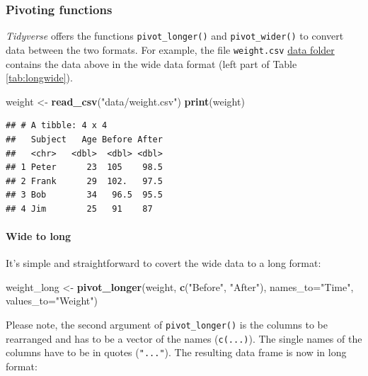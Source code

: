 \documentclass[
]{scrartcl}
\newenvironment{Shaded}{\begin{snugshade}}{\end{snugshade}}
\newcommand{\AttributeTok}[1]{\textcolor[rgb]{0.13,0.29,0.53}{#1}}
\newcommand{\FunctionTok}[1]{\textcolor[rgb]{0.13,0.29,0.53}{\textbf{#1}}}
\newcommand{\NormalTok}[1]{#1}
\newcommand{\OtherTok}[1]{\textcolor[rgb]{0.56,0.35,0.01}{#1}}
\newcommand{\StringTok}[1]{\textcolor[rgb]{0.31,0.60,0.02}{#1}}
\begin{document}
\hypertarget{pivoting-functions}{%
\subsubsection{Pivoting functions}\label{pivoting-functions}}

\emph{Tidyverse} offers the functions \texttt{pivot\_longer()} and \texttt{pivot\_wider()} to convert data between the two formats. For example, the file \texttt{weight.csv} \href{./data}{data folder} contains the data above in the wide data format (left part of Table \ref{tab:longwide}).

\begin{Shaded}
\begin{Highlighting}[]
\NormalTok{weight }\OtherTok{\textless{}{-}} \FunctionTok{read\_csv}\NormalTok{(}\StringTok{"data/weight.csv"}\NormalTok{)}
\FunctionTok{print}\NormalTok{(weight)}
\end{Highlighting}
\end{Shaded}

\begin{verbatim}
## # A tibble: 4 x 4
##   Subject   Age Before After
##   <chr>   <dbl>  <dbl> <dbl>
## 1 Peter      23  105    98.5
## 2 Frank      29  102.   97.5
## 3 Bob        34   96.5  95.5
## 4 Jim        25   91    87
\end{verbatim}

\hypertarget{wide-to-long}{%
\paragraph*{Wide to long}\label{wide-to-long}}

It's simple and straightforward to covert the wide data to a long format:

\begin{Shaded}
\begin{Highlighting}[]
\NormalTok{weight\_long }\OtherTok{\textless{}{-}} \FunctionTok{pivot\_longer}\NormalTok{(weight, }\FunctionTok{c}\NormalTok{(}\StringTok{"Before"}\NormalTok{, }\StringTok{"After"}\NormalTok{), }\AttributeTok{names\_to=}\StringTok{"Time"}\NormalTok{, }\AttributeTok{values\_to=}\StringTok{"Weight"}\NormalTok{)}
\end{Highlighting}
\end{Shaded}

Please note, the second argument of \texttt{pivot\_longer()} is the columns to be rearranged and has to be a vector of the names (\texttt{c(...)}). The single names of the columns have to be in quotes (\texttt{"..."}). The resulting data frame is now in long format:
\end{document}
